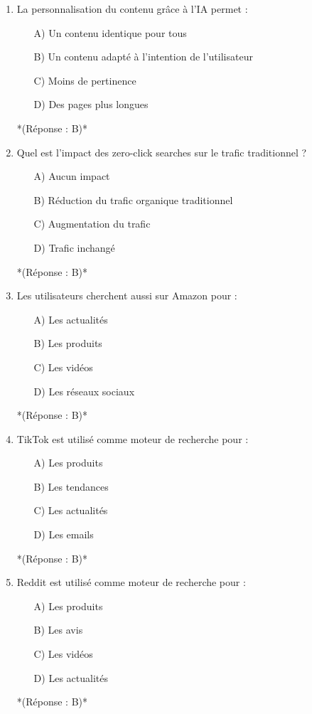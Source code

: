 \documentclass[12pt,a4paper,twoside]{report}
\begin{document}
\begin{enumerate}
    \item La personnalisation du contenu grâce à l'IA permet :
    \begin{itemize}
        \item[A)] Un contenu identique pour tous
        \item[B)] Un contenu adapté à l'intention de l'utilisateur
        \item[C)] Moins de pertinence
        \item[D)] Des pages plus longues
    \end{itemize}
    *(Réponse : B)*

    \item Quel est l'impact des zero-click searches sur le trafic traditionnel ?
    \begin{itemize}
        \item[A)] Aucun impact
        \item[B)] Réduction du trafic organique traditionnel
        \item[C)] Augmentation du trafic
        \item[D)] Trafic inchangé
    \end{itemize}
    *(Réponse : B)*

    \item Les utilisateurs cherchent aussi sur Amazon pour :
    \begin{itemize}
        \item[A)] Les actualités
        \item[B)] Les produits
        \item[C)] Les vidéos
        \item[D)] Les réseaux sociaux
    \end{itemize}
    *(Réponse : B)*

    \item TikTok est utilisé comme moteur de recherche pour :
    \begin{itemize}
        \item[A)] Les produits
        \item[B)] Les tendances
        \item[C)] Les actualités
        \item[D)] Les emails
    \end{itemize}
    *(Réponse : B)*

    \item Reddit est utilisé comme moteur de recherche pour :
    \begin{itemize}
        \item[A)] Les produits
        \item[B)] Les avis
        \item[C)] Les vidéos
        \item[D)] Les actualités
    \end{itemize}
    *(Réponse : B)*


\end{enumerate}
\end{document}
